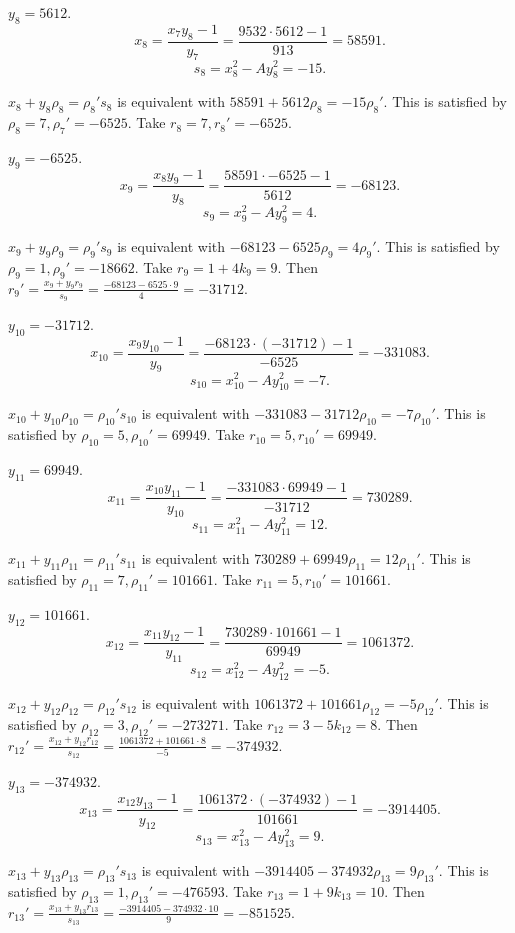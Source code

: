\documentclass{article}
\theoremstyle{definition}
\begin{document}
$y_8=5612$.
\[
x_8 = \frac{x_7y_8-1}{y_7} = \frac{9532 \cdot 5612-1}{913} = 58591.
\]
\[
s_8 = x_8^2 - Ay_8^2 = -15.
\]

$x_8+y_8\rho_8=\rho_8's_8$ is equivalent with
$58591+5612\rho_8=-15\rho_8'$. This is satisfied by
$\rho_8=7, \rho_7'=-6525$.
Take $r_8=7, r_8'=-6525$.

$y_9=-6525$.
\[
x_9 = \frac{x_8y_9-1}{y_8} = \frac{58591 \cdot -6525-1}{5612} = -68123.
\]
\[
s_9 = x_9^2 - Ay_9^2 = 4.
\]


$x_9+y_9\rho_9=\rho_9's_9$ is equivalent with
$-68123 - 6525\rho_9=4 \rho_9'$. This is satisfied by
$\rho_9=1, \rho_9'=-18662$.
Take $r_9=1+4k_9 = 9$. Then
$r_9' = \frac{x_9+y_9r_9}{s_9} = \frac{-68123 - 6525 \cdot 9}{4} =  -31712$.

$y_{10}=-31712$.
\[
x_{10} = \frac{x_9y_{10}-1}{y_9} = \frac{-68123 \cdot (-31712)-1}{-6525} = -331083.
\]
\[
s_{10} = x_{10}^2 - Ay_{10}^2 =  -7.
\]

$x_{10}+y_{10} \rho_{10} =\rho_{10}'s_{10}$ is equivalent with
$-331083 - 31712\rho_{10}= - 7 \rho_{10}'$. This is satisfied by
$\rho_{10}=5, \rho_{10}'=69949$.
Take $r_{10}=5, r_{10}'=69949$.

$y_{11}=69949$.
\[
x_{11} = \frac{x_{10}y_{11}-1}{y_{10}} = \frac{-331083 \cdot 69949-1}{-31712} = 730289.
\]
\[
s_{11} = x_{11}^2 - Ay_{11}^2 =  12.
\]

$x_{11}+y_{11} \rho_{11} =\rho_{11}'s_{11}$ is equivalent with
$730289 +69949\rho_{11}= 12 \rho_{11}'$. This is satisfied by
$\rho_{11}=7, \rho_{11}'=101661$.
Take $r_{11}=5, r_{10}'=101661$.

$y_{12}=101661$.
\[
x_{12} = \frac{x_{11}y_{12}-1}{y_{11}} = \frac{730289 \cdot 101661-1}{69949} = 1061372.
\]
\[
s_{12} = x_{12}^2 - Ay_{12}^2 =  -5.
\]





$x_{12}+y_{12} \rho_{12} =\rho_{12}'s_{12}$ is equivalent with
$1061372 +101661\rho_{12}= -5 \rho_{12}'$. This is satisfied by
$\rho_{12}=3, \rho_{12}'=-273271$.
Take $r_{12}=3-5k_{12} = 8$.
Then $r_{12}'= \frac{x_{12}+y_{12}r_{12}}{s_{12}}
=\frac{1061372 + 101661 \cdot 8}{-5}=-374932$.

$y_{13}=-374932$.
\[
x_{13} = \frac{x_{12}y_{13}-1}{y_{12}} = \frac{1061372 \cdot (-374932)-1}{101661} = -3914405.
\]
\[
s_{13} = x_{13}^2 - Ay_{13}^2 =  9.
\]

$x_{13}+y_{13} \rho_{13} =\rho_{13}'s_{13}$ is equivalent with
$-3914405-374932\rho_{13}= 9 \rho_{13}'$. This is satisfied by
$\rho_{13}=1, \rho_{13}'=-476593$.
Take $r_{13}=1+9k_{13} = 10$.
Then $r_{13}'= \frac{x_{13}+y_{13}r_{13}}{s_{13}}
=\frac{-3914405 -374932 \cdot 10}{9}=-851525$.
\end{document}

